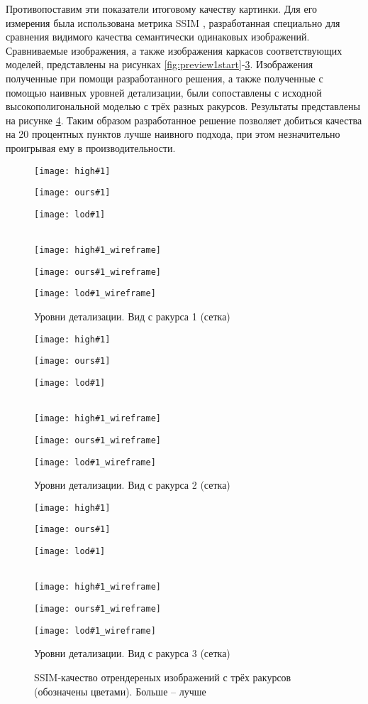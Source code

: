 Противопоставим эти показатели итоговому качеству картинки. Для его измерения была использована метрика SSIM \cite{wang2004image}, разработанная специально для сравнения видимого качества семантически одинаковых изображений. Сравниваемые изображения, а также изображения каркасов соответствующих моделей, представлены на рисунках \ref{fig:preview1start}-\ref{fig:preview3end}. Изображения полученные при помощи разработанного решения, а также полученные с помощью наивных уровней детализации, были сопоставлены с исходной высокополигональной моделью с трёх разных ракурсов. Результаты представлены на рисунке \ref{fig:quality}. Таким образом разработанное решение позволяет добиться качества на 20 процентных пунктов лучше наивного подхода, при этом незначительно проигрывая ему в производительности.

\newcommand{\showpreviews}[1]{
  \begin{figure}[h]
    \minipage{0.32\textwidth}
      \centering
      \texttt{[image: high\#1]}
      \caption{Оригинальная модель. Вид с ракурса #1}
      \label{fig:preview#1start}
    \endminipage\hfill
    \minipage{0.32\textwidth}
      \centering
      \texttt{[image: ours\#1]}
      \caption{Предлагаемый метод. Вид с ракурса #1}
    \endminipage\hfill
    \minipage{0.32\textwidth}
      \centering
      \texttt{[image: lod\#1]}
      \caption{Уровни детализации. Вид с ракурса #1}
    \endminipage
    \\
    \minipage{0.32\textwidth}
      \centering
      \texttt{[image: high\#1\_wireframe]}
      \caption{Оригинальная модель. Вид с ракурса #1 (сетка)}
    \endminipage\hfill
    \minipage{0.32\textwidth}
      \centering
      \texttt{[image: ours\#1\_wireframe]}
      \caption{Предлагаемый метод. Вид с ракурса #1 (сетка)}
    \endminipage\hfill
    \minipage{0.32\textwidth}
      \centering
      \texttt{[image: lod\#1\_wireframe]}
      \caption{Уровни детализации. Вид с ракурса #1 (сетка)}
      \label{fig:preview#1end}
    \endminipage
  \end{figure}
}

\showpreviews{1}
\showpreviews{2}
\showpreviews{3}

\begin{figure}[h]
  \centering
  \caption{SSIM-качество отрендереных изображений с трёх ракурсов (обозначены цветами). Больше -- лучше}
  \label{fig:quality}
\end{figure}
